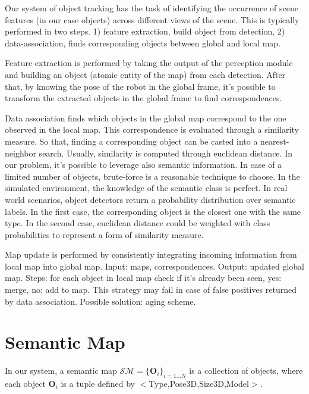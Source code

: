 \documentclass{article}
\begin{document}
	
	Our system of object tracking has the task of identifying the occurrence of scene features (in our case objects) across different views of the scene. This is typically performed in two steps. 1) feature extraction, build object from detection, 2) data-association, finds corresponding objects between global and local map.
	
	Feature extraction is performed by taking the output of the perception module and building an object (atomic entity of the map) from each detection. After that, by knowing the pose of the robot in the global frame, it's possible to transform the extracted objects in the global frame to find correspondences.
	
	Data association finds which objects in the global map correspond to the one observed in the local map. This correspondence is evaluated through a similarity measure. So that, finding a corresponding object can be casted into a nearest-neighbor search. Usually, similarity is computed through euclidean distance. In our problem, it's possible to leverage also semantic information. In case of a limited number of objects, brute-force is a reasonable technique to choose. In the simulated environment, the knowledge of the semantic class is perfect. In real world scenarios, object detectors return a probability distribution over semantic labels. In the first case, the corresponding object is the closest one with the same type. In the second case, euclidean distance could be weighted with class probabilities to represent a form of similarity measure.
	
	Map update is performed by consistently integrating incoming information from local map into global map. Input: maps, correspondences. Output: updated global map. Steps: for each object in local map check if it's already been seen, yes: merge, no: add to map. This strategy may fail in case of false positives returned by data association. Possible solution:  aging scheme.
		
	\section*{Semantic Map}
	
	In our system, a semantic map $\mathcal{SM} = \{\mathbf{O}_i\}_{i=1 \dots N}$ is a collection of objects, where each object $\mathbf{O}_i$ is a tuple defined by $<$Type,Pose3D,Size3D,Model$>$.
	
\end{document}
